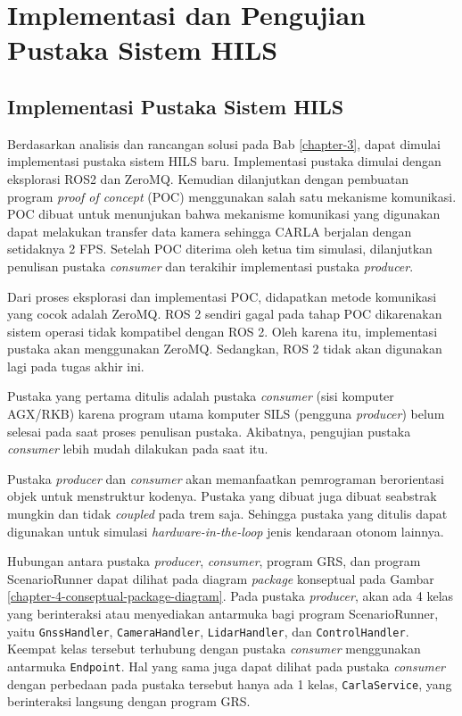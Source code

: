 \chapter{Implementasi dan Pengujian Pustaka Sistem HILS}\label{chapter-4}

\section{Implementasi Pustaka Sistem HILS}

Berdasarkan analisis dan rancangan solusi pada Bab \ref{chapter-3}, dapat
dimulai implementasi pustaka sistem HILS baru. Implementasi pustaka dimulai
dengan eksplorasi ROS2 dan ZeroMQ. Kemudian dilanjutkan dengan pembuatan program
\textit{proof of concept} (POC) menggunakan salah satu mekanisme komunikasi. POC
dibuat untuk menunjukan bahwa mekanisme komunikasi yang digunakan dapat
melakukan transfer data kamera sehingga CARLA berjalan dengan setidaknya 2 FPS.
Setelah POC diterima oleh ketua tim simulasi, dilanjutkan penulisan pustaka
\textit{consumer} dan terakihir implementasi pustaka \textit{producer}.

Dari proses eksplorasi dan implementasi POC, didapatkan metode komunikasi yang
cocok adalah ZeroMQ. ROS 2 sendiri gagal pada tahap POC dikarenakan sistem
operasi tidak kompatibel dengan ROS 2. Oleh karena itu, implementasi pustaka
akan menggunakan ZeroMQ. Sedangkan, ROS 2 tidak akan digunakan lagi pada tugas
akhir ini.

Pustaka yang pertama ditulis adalah pustaka \textit{consumer} (sisi
komputer AGX/RKB) karena program utama komputer SILS (pengguna
\textit{producer}) belum selesai pada saat proses penulisan pustaka. Akibatnya,
pengujian pustaka \textit{consumer} lebih mudah dilakukan pada saat itu.

Pustaka \textit{producer} dan \textit{consumer} akan memanfaatkan pemrograman
berorientasi objek untuk menstruktur kodenya. Pustaka yang dibuat juga dibuat
seabstrak mungkin dan tidak \textit{coupled} pada trem saja. Sehingga pustaka
yang ditulis dapat digunakan untuk simulasi \textit{hardware-in-the-loop} jenis
kendaraan otonom lainnya.

Hubungan antara pustaka \textit{producer}, \textit{consumer}, program GRS, dan
program ScenarioRunner dapat dilihat pada diagram \textit{package} konseptual
pada Gambar \ref{chapter-4-conseptual-package-diagram}. Pada pustaka
\textit{producer}, akan ada 4 kelas yang berinteraksi atau menyediakan antarmuka
bagi program ScenarioRunner, yaitu \texttt{GnssHandler}, \texttt{CameraHandler},
\texttt{LidarHand\-ler}, dan \texttt{ControlHandler}. Keempat kelas tersebut
terhubung dengan pustaka \textit{consumer} menggunakan antarmuka
\texttt{Endpoint}. Hal yang sama juga dapat dilihat pada pustaka
\textit{consumer} dengan perbedaan pada pustaka tersebut hanya ada 1 kelas,
\texttt{CarlaService}, yang berinteraksi langsung dengan program GRS.

